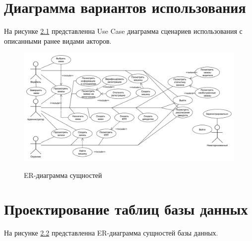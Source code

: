 \section{Диаграмма вариантов использования}
На рисунке \hyperref[use_case]{2.1} представленна Use Case диаграмма сценариев использования с описанными ранее видами акторов.


\begin{figure}[ph!] \label{use_case}
	\begin{center}
		{\includegraphics[scale=0.4, angle=-90]{schemes/use-case.pdf}}
		\caption{ER-диаграмма сущностей}
	\end{center}
\end{figure}


\section{Проектирование таблиц базы данных}
На рисунке \hyperref[er_db]{2.2} представленна ER-диаграмма сущностей базы данных.

